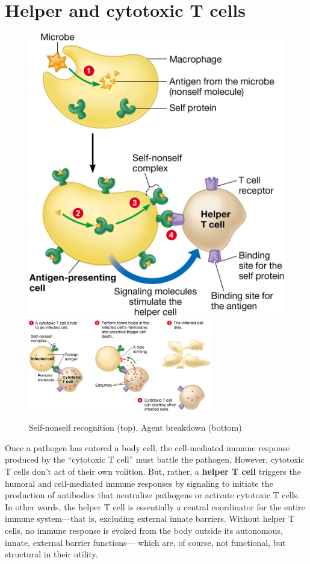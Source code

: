\documentclass{article}
\begin{document}
\section{Helper and cytotoxic T cells}

\begin{figure}
	\centering
	\includegraphics[width=1\linewidth]{self_nonself_complex.png}
	\bigbreak{}
	\includegraphics[width=8cm]{cytotoxic_t_cell.png}
	\caption{Self-nonself recognition (top), Agent breakdown (bottom)}
\end{figure}

Once a pathogen has entered a body cell, the cell-mediated immune response
produced by the ``cytotoxic T cell'' must battle the pathogen. However,
cytotoxic T cells don't act of their own volition. But, rather, a
\textbf{helper T cell} triggers the humoral and cell-mediated immune responses
by signaling to initiate the production of antibodies that neutralize pathogens
or activate cytotoxic T cells. In other words, the helper T cell is essentially
a central coordinator for the entire immune system---that is, excluding
external innate barriers. Without helper T cells, no immune response is evoked
from the body outside its autonomous, innate, external barrier functions---
which are, of course, not functional, but structural in their utility.
\end{document}

